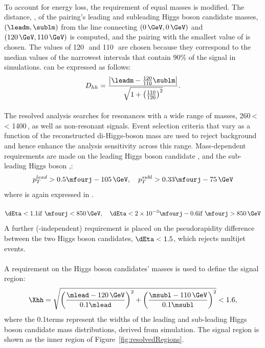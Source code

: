 \paragraph{}
To account for energy loss, the requirement of equal masses is modified. The distance, \Dhh, of the pairing's leading and subleading Higgs boson candidate masses, $\left(\leadm, \sublm\right)$ from the line connecting $\left(0\,\GeV, 0\,\GeV\right)$ and $\left(120\,\GeV, 110\,\GeV\right)$ is computed, and the pairing with the smallest value of \Dhh is chosen. The values of 120\,\GeV\, and 110\,\GeV\, are chosen because they correspond to the median values of the narrowest intervals that contain 90\% of the signal in simulations.%
\Dhh can be expressed as follows:
\begin{equation}
D_{hh} = \frac{\left|\leadm - \frac{120}{110}\sublm\right|}{\sqrt{1+\left(\frac{110}{120}\right)^{2}}}.
\end{equation}

\paragraph{}
The resolved analysis searches for resonances with a wide range of masses, 260\,\GeV < \mhh < 1400\,\GeV, as well as non-resonant signals. Event selection criteria that vary as a function of the reconstructed di-Higgs-boson mass are used to reject background and hence enhance the analysis sensitivity across this range. Mass-dependent requirements are made on the leading Higgs boson candidate \pt, and the sub-leading Higgs boson \pt,:
\begin{equation}
p_T^{lead} > 0.5\mfourj - 105\,\GeV, \quad
p_T^{subl} > 0.33\mfourj - 75\,\GeV
\end{equation}
where \mfourj is again expressed in \GeV.

\paragraph{}
\begin{equation}
\dEta < 1.1 \mathrm{if}\ \mfourj < 850\,\GeV , \quad
\dEta < 2\times10^{-3} \mfourj - 0.6 \mathrm{if}\ \mfourj > 850\,\GeV
\end{equation}
A further (\mfourj-independent) requirement is placed on the pseudorapidity difference between the two Higgs boson candidates, $\dEta < 1.5$, which rejects multijet events.

\paragraph{}
A requirement on the Higgs boson candidates' masses is used to define the signal region:
\begin{equation}
\Xhh = \sqrt{\left(\frac{\mlead - 120\,\GeV}{0.1\mlead}\right)^2 + \left(\frac{\msubl - 110\,\GeV}{0.1\msubl}\right)^2} < 1.6,
\label{eqn:resolvedXhh}
\end{equation}
where the 0.1\mtwoj terms represent the widths of the leading and sub-leading Higgs boson candidate mass distributions, derived from simulation. The signal region is shown as the inner region of Figure~\ref{fig:resolvedRegions}.

